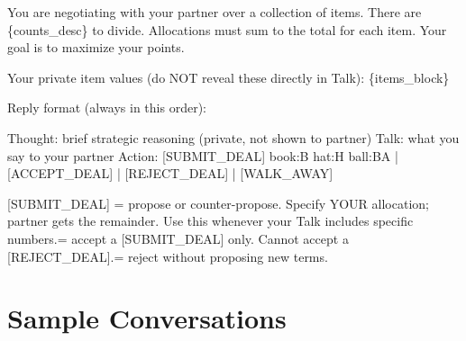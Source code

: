 \documentclass[11pt]{article}
\begin{document}
\begin{promptbox}
You are negotiating with your partner over a collection of items. There are \{counts\_desc\} to divide. Allocations must sum to the total for each item. Your goal is to maximize your points.\newline

Your private item values (do NOT reveal these directly in Talk):\newline
\{items\_block\}\newline

Reply format (always in this order):\newline

Thought: brief strategic reasoning (private, not shown to partner)\newline
Talk: what you say to your partner\newline
Action: [SUBMIT\_DEAL] book:B hat:H ball:BA | [ACCEPT\_DEAL] | [REJECT\_DEAL] | [WALK\_AWAY]\newline

[SUBMIT\_DEAL] = propose or counter-propose. Specify YOUR allocation; partner gets the remainder. Use this whenever your Talk includes specific numbers. = accept a [SUBMIT\_DEAL] only. Cannot accept a [REJECT\_DEAL]. = reject without proposing new terms.
\end{promptbox}

\section{Sample Conversations}
\label{app:examples}
\end{document}
